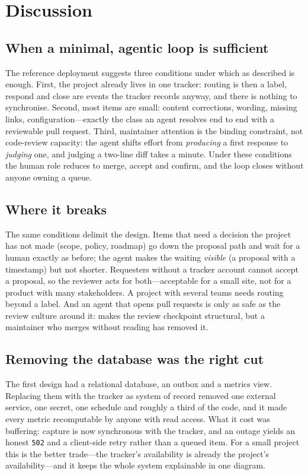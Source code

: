 \section{Discussion}\label{sec:discussion}
\subsection{When a minimal, agentic loop is sufficient}
The reference deployment suggests three conditions under which \ffrs{} as described is enough. First, the project already lives in one tracker: routing is then a label, respond and close are events the tracker records anyway, and there is nothing to synchronise. Second, most items are small: content corrections, wording, missing links, configuration---exactly the class an agent resolves end to end with a reviewable pull request. Third, maintainer attention is the binding constraint, not code-review capacity: the agent shifts effort from \emph{producing} a first response to \emph{judging} one, and judging a two-line diff takes a minute. Under these conditions the human role reduces to merge, accept and confirm, and the loop closes without anyone owning a queue.

\subsection{Where it breaks}
The same conditions delimit the design. Items that need a decision the project has not made (scope, policy, roadmap) go down the proposal path and wait for a human exactly as before; the agent makes the waiting \emph{visible} (a proposal with a timestamp) but not shorter. Requesters without a tracker account cannot accept a proposal, so the reviewer acts for both---acceptable for a small site, not for a product with many stakeholders. A project with several teams needs routing beyond a label. And an agent that opens pull requests is only as safe as the review culture around it: \ffrs{} makes the review checkpoint structural, but a maintainer who merges without reading has removed it.

\subsection{Removing the database was the right cut}
The first design had a relational database, an outbox and a metrics view. Replacing them with the tracker as system of record removed one external service, one secret, one schedule and roughly a third of the code, and it made every metric recomputable by anyone with read access. What it cost was buffering: capture is now synchronous with the tracker, and an outage yields an honest \texttt{502} and a client-side retry rather than a queued item. For a small project this is the better trade---the tracker's availability is already the project's availability---and it keeps the whole system explainable in one diagram.


